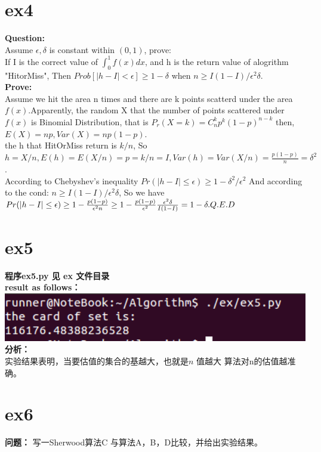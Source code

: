 \documentclass[10pt, a4paper]{article}
\begin{document}
\section{ex4}
\textbf{Question:} \\
Assume $\epsilon, \delta$ is constant within $(0, 1)$, prove: \\
If I is the correct value of $\int_0^1{f(x)dx}$, and h is the return value of alogrithm "HitorMiss", Then $Prob[|h-I| < \epsilon] \geq 1 - \delta$ when $n \geq I(1-I)/\epsilon^{2}\delta$. \\
 \textbf{Prove:}\\
Assume we hit the area n times and there are  k points scatterd under the area $f(x)$.Apparently, the random X that the number of points scattered under $f(x)$ is Binomial Distribution, that is $P_r(X = k) = C_n^{k}p^{k}(1-p)^{n-k}$
then, $E(X) = np, Var(X) = np(1-p)$.\\
the h that HitOrMiss return is $k/n$, So $h = X/n, E(h) = E(X/n) = p = k/n = I, Var(h) = Var(X/n) = \frac{p(1-p)}{n} = \delta^{2}$. \\
According to Chebyshev's inequality $Pr(|h - I| \leq \epsilon) \geq 1 - \delta^{2}/\epsilon^{2} $  And according to the cond: $n \geq I(1-I)/\epsilon^{2}\delta$, So we have $Pr(|h - I| \leq \epsilon )\geq 1 - \frac{p(1-p)}{\epsilon^{2}n} \geq 1 - \frac{p(1-p)}{\epsilon^{2}}\frac{\epsilon^{2}\delta}{I(1-I)} = 1 - \delta.\\
Q.E.D$

\section{ex5}

\textbf{程序ex5.py 见 ex 文件目录 }\\
\textbf{result as follows：} \\

\includegraphics[width=15cm]{../pic/ex5.png}
\textbf{分析：} \\
实验结果表明，当要估值的集合的基越大，也就是$n$ 值越大 算法对n的估值越准确。
\section{ex6}

\textbf{问题：}
写一Sherwood算法C 与算法A，B，D比较，并给出实验结果。
\end{document}
